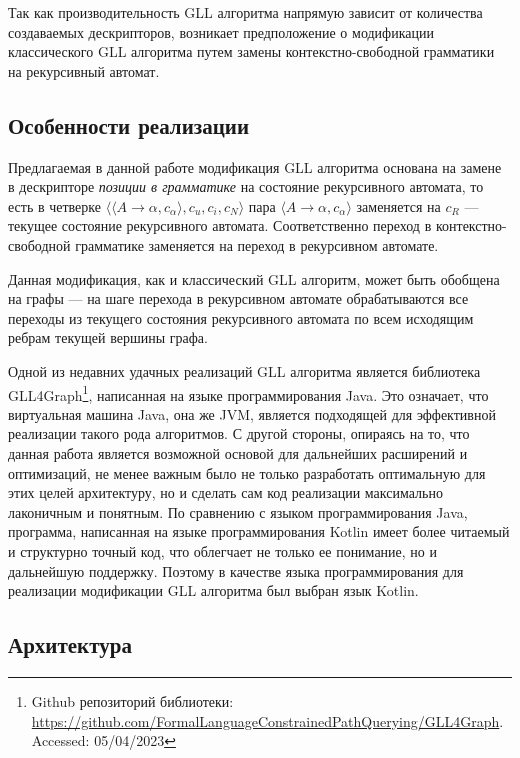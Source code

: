 Так как производительность GLL алгоритма напрямую зависит от количества создаваемых дескрипторов, возникает предположение о модификации классического GLL алгоритма путем замены контекстно-свободной грамматики на рекурсивный автомат.

\subsection{Особенности реализации} 

Предлагаемая в данной работе модификация GLL алгоритма основана на замене в дескрипторе \emph{позиции в грамматике} на состояние рекурсивного автомата, то есть в четверке $\langle \langle A \rightarrow \alpha, c_{\alpha} \rangle, c_{u}, c_{i}, c_{N} \rangle$ пара $\langle A \rightarrow \alpha, c_{\alpha} \rangle$ заменяется на $c_{R}$ --- текущее состояние рекурсивного автомата.
Соответственно переход в контекстно-свободной грамматике заменяется на переход в рекурсивном автомате.

Данная модификация, как и классический GLL алгоритм, может быть обобщена на графы --- на шаге перехода в рекурсивном автомате обрабатываются все переходы из текущего состояния рекурсивного автомата по всем исходящим ребрам текущей вершины графа.

Одной из недавних удачных реализаций GLL алгоритма является библиотека GLL4Graph\footnote{Github репозиторий библиотеки: \url{https://github.com/FormalLanguageConstrainedPathQuerying/GLL4Graph}. Accessed: 05/04/2023}, написанная на языке программирования Java.
Это означает, что виртуальная машина Java, она же JVM, является подходящей для эффективной реализации такого рода алгоритмов.
С другой стороны, опираясь на то, что данная работа является возможной основой для дальнейших расширений и оптимизаций, не менее важным было не только разработать оптимальную для этих целей архитектуру, но и сделать сам код реализации максимально лаконичным и понятным.
По сравнению с языком программирования Java, программа, написанная на языке программирования Kotlin имеет более читаемый и структурно точный код, что облегчает не только ее понимание, но и дальнейшую поддержку. 
Поэтому в качестве языка программирования для реализации модификации GLL алгоритма был выбран язык Kotlin.

\subsection{Архитектура}

